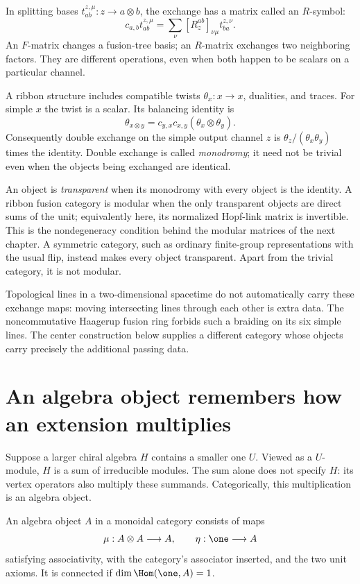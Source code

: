 In splitting bases $t_{ab}^{z,\mu}:z\to a\otimes b$, the exchange
has a matrix called an $R$-symbol:
\[
 c_{a,b}t_{ab}^{z,\mu}
 =\sum_\nu [R^{ab}_z]_{\nu\mu}t_{ba}^{z,\nu}.
\]
An $F$-matrix changes a fusion-tree basis; an $R$-matrix exchanges
two neighboring factors. They are different operations, even when
both happen to be scalars on a particular channel.

A ribbon structure includes compatible twists $\theta_x:x\to x$,
dualities, and traces. For simple $x$ the twist is a scalar. Its
balancing identity is
\[
 \theta_{x\otimes y}
 =c_{y,x}c_{x,y}(\theta_x\otimes\theta_y).
\]
Consequently double exchange on the simple output channel $z$ is
$\theta_z/(\theta_x\theta_y)$ times the identity. Double exchange
is called \emph{monodromy}; it need not be trivial even when the
objects being exchanged are identical.

An object is \emph{transparent} when its monodromy with every object
is the identity. A ribbon fusion category is modular when the only
transparent objects are direct sums of the unit; equivalently here,
its normalized Hopf-link matrix is invertible. This is the
nondegeneracy condition behind the modular matrices of the next
chapter. A symmetric category, such as ordinary finite-group
representations with the usual flip, instead makes every object
transparent. Apart from the trivial category, it is not modular.

Topological lines in a two-dimensional spacetime do not automatically
carry these exchange maps: moving intersecting lines through each
other is extra data. The noncommutative Haagerup fusion ring forbids
such a braiding on its six simple lines. The center construction
below supplies a different category whose objects carry precisely
the additional passing data.

\section{An algebra object remembers how an extension multiplies}

Suppose a larger chiral algebra $H$ contains a smaller one $U$.
Viewed as a $U$-module, $H$ is a sum of irreducible modules.  The sum
alone does not specify $H$: its vertex operators also multiply these
summands.  Categorically, this multiplication is an algebra object.

\begin{definition}
An algebra object $A$ in a monoidal category consists of maps
\[
 \mu:A\otimes A\longrightarrow A,
 \qquad \eta:\one\longrightarrow A
\]
satisfying associativity, with the category's associator inserted,
and the two unit axioms.  It is connected if
$\dim\Hom(\one,A)=1$.
\end{definition}

